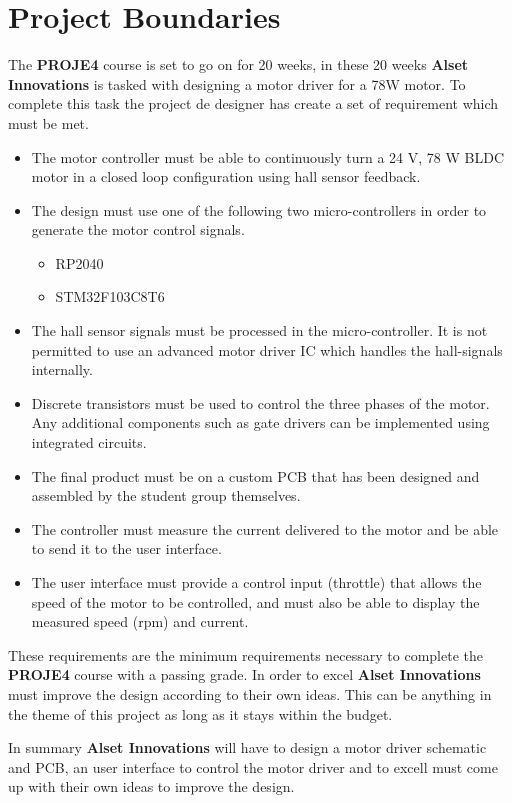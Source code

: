 \section{Project Boundaries}
The \textbf{PROJE4} course is set to go on for 20 weeks, in these 20 weeks \textbf{Alset Innovations} is tasked with designing a motor driver for a 78W motor. To complete this task the project de designer has create a set of requirement which must be met.

\begin{itemize}
    \item The motor controller must be able to continuously turn a 24 V, 78 W
    BLDC motor in a closed loop configuration using hall sensor feedback.
    \item  The design must use one of the following two micro-controllers in order to
    generate the motor control signals.
    \begin{itemize}
        \item RP2040 
        \item STM32F103C8T6 
    \end{itemize}
    \item The hall sensor signals must be processed in the micro-controller. It
    is not permitted to use an advanced motor driver IC which handles the
    hall-signals internally.
    \item Discrete transistors must be used to control the three phases of the motor. Any additional components such as gate drivers can be implemented using integrated circuits.
    \item The final product must be on a custom PCB that has been designed and assembled by the student group themselves. 
    \item The controller must measure the current delivered to the motor and be able to send it to the user interface. 
    \item The user interface must provide a control input (throttle) that allows the speed of the motor to be controlled, and must also be able to display the measured speed (rpm) and current.
\end{itemize}

These requirements are the minimum requirements necessary to complete the \textbf{PROJE4} course with a passing grade. In order to excel \textbf{Alset Innovations} must improve the design according to their own ideas. This can be anything in the theme of this project as long as it stays within the budget.

In summary \textbf{Alset Innovations} will have to design a motor driver schematic and PCB, an user interface to control the motor driver and to excell must come up with their own ideas to improve the design.